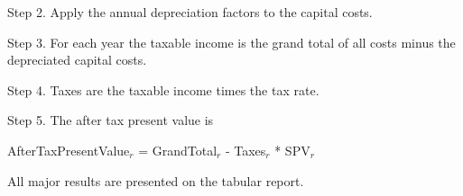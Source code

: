 Step 2. Apply the annual depreciation factors to the capital costs.

Step 3. For each year the taxable income is the grand total of all costs minus the depreciated capital costs.

Step 4. Taxes are the taxable income times the tax rate.

Step 5. The after tax present value is

AfterTaxPresentValue\(_{r}\) = GrandTotal\(_{r}\) - Taxes\(_{r}\) * SPV\(_{r}\)

All major results are presented on the tabular report.
